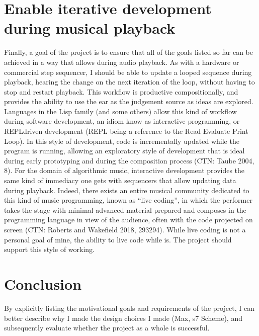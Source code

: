 \documentclass[letterpaper,10pt,english]{sphinxmanual}
\begin{document}
\section{Enable iterative development during musical playback}
\label{\detokenize{goals:enable-iterative-development-during-musical-playback}}
\sphinxAtStartPar
Finally, a goal of the project is to ensure that all of the goals listed so far can be achieved in a way that
allows  during audio playback.
As with a hardware or commercial step sequencer, I should be able to update a looped sequence during playback,
hearing the change on the next iteration of the loop, without having to stop and restart playback.
This workflow is productive compositionally, and provides the ability to use the ear as the judgement source as ideas are explored.
Languages in the Lisp family (and some others) allow this kind of workflow during software development,
an idiom know as interactive programming, or REPL\sphinxhyphen{}driven development (REPL being a reference to the Read Evaluate Print Loop).
In this style of development, code is incrementally updated while the program is running, allowing an exploratory style of development
that is ideal during early prototyping and during the composition process (CTN: Taube 2004, 8).
For the domain of algorithmic music, interactive development provides the same kind of immediacy one
gets with sequencers that allow updating data during playback.
Indeed, there exists an entire musical community dedicated to this kind of music programming,
known as “live coding”, in which the performer takes the stage with minimal advanced material prepared
and composes in the programming language in view of the audience, often with the code projected on screen
(CTN: Roberts and Wakefield 2018, 293\sphinxhyphen{}294).
While  live coding is not a personal goal of mine, the ability to live code while  is.
The project should support this style of working.


\section{Conclusion}
\label{\detokenize{goals:conclusion}}
\sphinxAtStartPar
By explicitly listing the motivational goals and requirements of the project, I can
better describe why I made the design choices I made (Max, s7 Scheme),
and subsequently evaluate whether the project as a whole is successful.

\sphinxstepscope
\end{document}
